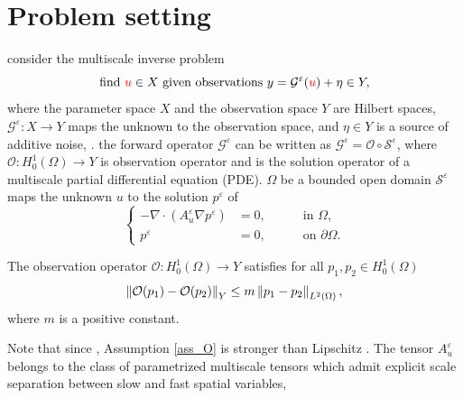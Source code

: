 \documentclass[10pt]{article}
\begin{document}
\section{Problem setting}\label{Setting}

 consider the multiscale inverse problem
\begin{equation}
\label{multiscale_inverse_problem}
\text{find } {\color{red}u} \in X \text{ given observations } y = \mathcal{G}^{\varepsilon}({\color{red}u}) + \eta \in Y,
\end{equation}
where the parameter space $X$ and the observation space $Y$ are Hilbert spaces,  $\mathcal{G}^{\varepsilon} \colon X \to Y$ maps the unknown to the observation space, and $\eta \in Y$ is a source of additive noise, .  the forward operator $\mathcal{G}^{\varepsilon}$ can be written as $\mathcal{G}^{\varepsilon} = \mathcal{O} \circ \mathcal{S}^{\varepsilon}$, where $\mathcal{O} \colon H^1_0(\Omega) \to Y$ is  observation operator and  is the solution operator of a multiscale  partial differential equation (PDE).  $\Omega$ be a bounded open domain  $\mathcal{S}^{\varepsilon}$ maps the unknown $u$ to the solution $p^{\varepsilon}$ of 
\begin{equation}
\label{intro_problem_multiscale}
\left\{
\begin{alignedat}{2}
- \nabla \cdot ( A^{\varepsilon}_u \nabla p^{\varepsilon} ) &= 0, \quad && \text{ in } \Omega, \\
	p^{\varepsilon} &= 0, \quad && \text{ on } \partial \Omega.
\end{alignedat}
\right.
\end{equation}
\begin{assumption}\label{ass_O}
The observation operator $\mathcal{O} \colon H^1_0(\Omega) \to Y$ satisfies for all $p_1, p_2 \in H^1_0(\Omega)$
\[ \left\|\mathcal{O}(p_1) - \mathcal{O}(p_2)\right\|_Y \le m \left\|p_1 - p_2\right\|_{L^2(\Omega)}, \]
where $m$ is a positive constant.
\end{assumption}
Note that since , Assumption \ref{ass_O} is stronger than Lipschitz . The tensor $A^{\varepsilon}_u$ belongs to the class of parametrized multiscale tensors which admit explicit scale separation between slow and fast spatial variables, 
\end{document}
